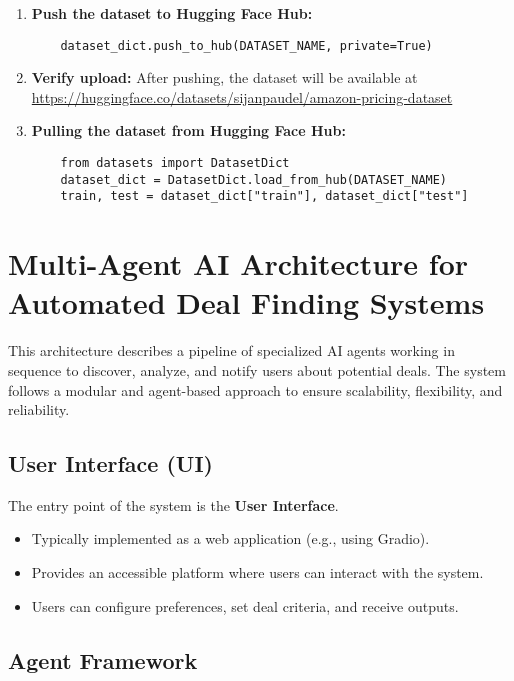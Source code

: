 \begin{tcolorbox}[colback=green!5!white, colframe=green!75!black, title=Dataset Upload Guide]
\begin{enumerate}
    \item \textbf{Push the dataset to Hugging Face Hub:}
    \begin{verbatim}
    dataset_dict.push_to_hub(DATASET_NAME, private=True)
    \end{verbatim}
    
    \item \textbf{Verify upload:} After pushing, the dataset will be available at \url{https://huggingface.co/datasets/sijanpaudel/amazon-pricing-dataset}


    \item \textbf{Pulling the dataset from Hugging Face Hub:}
    \begin{verbatim}
    from datasets import DatasetDict
    dataset_dict = DatasetDict.load_from_hub(DATASET_NAME)
    train, test = dataset_dict["train"], dataset_dict["test"]
    \end{verbatim}
\end{enumerate}
\end{tcolorbox}

\newpage

\section{Multi-Agent AI Architecture for Automated Deal Finding Systems}

This architecture describes a pipeline of specialized AI agents working in sequence to discover, analyze, and notify users about potential deals. The system follows a modular and agent-based approach to ensure scalability, flexibility, and reliability.

\subsection{User Interface (UI)}

The entry point of the system is the \textbf{User Interface}.
\begin{itemize}
    \item Typically implemented as a web application (e.g., using Gradio).  
    \item Provides an accessible platform where users can interact with the system.  
    \item Users can configure preferences, set deal criteria, and receive outputs.  
\end{itemize}

\subsection{Agent Framework}

